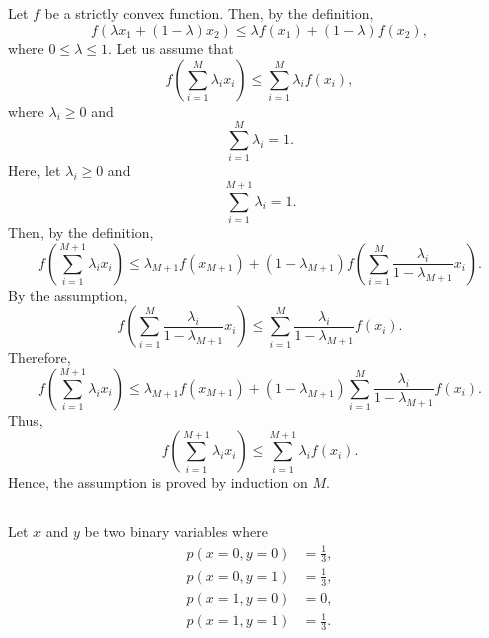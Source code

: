 \subsection{}
\label{1.38}
Let $f$ be a strictly convex function.
Then, by the definition,
%
\begin{equation}
f \left( \lambda x_1 + (1 - \lambda) x_2 \right) \leq \lambda f(x_1) + (1 - \lambda) f(x_2),
\end{equation}
%
where $0 \leq \lambda \leq 1$.
Let us assume that 
%
\begin{equation}
f \left( \sum_{i = 1}^{M} \lambda_i x_i \right) \leq \sum_{i = 1}^{M} \lambda_i f(x_i),
\end{equation}
%
where $\lambda_i \geq 0$ and
%
\begin{equation}
\sum_{i = 1}^{M} \lambda_i = 1.
\end{equation}
%
Here, let $\lambda_i \geq 0$ and
%
\begin{equation}
\sum_{i = 1}^{M + 1} \lambda_i = 1.
\end{equation}
%
Then, by the definition,
%
\begin{equation}
f \left( \sum_{i = 1}^{M + 1} \lambda_i x_i \right) \leq \lambda_{M + 1} f ( x_{M + 1} ) + (1 - \lambda_{M + 1}) f \left( \sum_{i = 1}^{M} \frac{\lambda_i}{1 - \lambda_{M + 1}} x_i \right).
\end{equation}
%
By the assumption,
%
\begin{equation}
f \left( \sum_{i = 1}^{M} \frac{\lambda_i}{1 - \lambda_{M + 1}} x_i \right) \leq \sum_{i = 1}^{M} \frac{\lambda_i}{1 - \lambda_{M + 1}} f(x_i).
\end{equation}
%
Therefore,
%
\begin{equation}
f \left( \sum_{i = 1}^{M + 1} \lambda_i x_i \right) \leq \lambda_{M + 1} f ( x_{M + 1} ) + (1 - \lambda_{M + 1}) \sum_{i = 1}^{M} \frac{\lambda_i}{1 - \lambda_{M + 1}} f(x_i).
\end{equation}
%
Thus,
%
\begin{equation}
f \left( \sum_{i = 1}^{M + 1} \lambda_i x_i \right) \leq \sum_{i = 1}^{M + 1} \lambda_i f(x_i).
\end{equation}
%
Hence, the assumption is proved by induction on $M$.


\subsection{}
\label{1.39}
Let $x$ and $y$ be two binary variables where
%
\begin{equation}
\begin{aligned}
p(x = 0, y = 0) &= \frac{1}{3}, \\
p(x = 0, y = 1) &= \frac{1}{3}, \\
p(x = 1, y = 0) &= 0, \\
p(x = 1, y = 1) &= \frac{1}{3}.
\end{aligned}
\end{equation}
%


